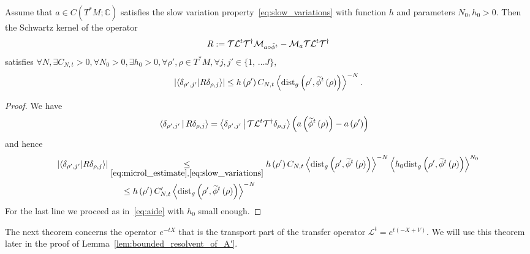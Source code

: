 \documentclass[AHL,Unicode,longabstracts,published]{cedram}
\newcommand{\clT}{\mathcal{T}}
\newcommand{\clL}{\mathcal{L}}
\newcommand{\clM}{\mathcal{M}}
\newcommand{\dist}{\mathrm{dist}}
\newcommand{\bbC}{\mathbb{C}}
\let\oldtilde\tilde
\renewcommand*{\tilde}[1]{\mathchoice{\widetilde{#1}}{\widetilde{#1}}{\oldtilde{#1}}{\oldtilde{#1}}}
\let\oldexists\exists
\renewcommand*{\exists}{\mathrel{\oldexists}}
\let\oldforall\forall
\renewcommand*{\forall}{\mathrel{\oldforall}}
\begin{document}
\begin{cBoxB}{}
\begin{lemm}\label{lem:Basic_Egorov_lemma}
Assume that $a\in C(T^{*}M;\bbC)$ satisfies the slow variation property~\eqref{eq:slow_variations} with function $h$ and parameters $N_{0},h_{0}>0$. Then the Schwartz kernel of the operator
\[
R:=\clT\clL^{t}\clT^{\dagger}\clM_{a\circ\tilde{\phi}^{t}}-\clM_{a}\clT\clL^{t}\clT^{\dagger}
\]
satisfies $\forall N,\exists C_{N,t}>0,\forall N_{0}>0,\exists h_{0}>0,\forall\rho',\rho\in T^{*}M,\forall j,j'\in\{ 1,\,\ldots J\},$
\begin{equation}\label{eq:Egorov_Lemma}
\left|\langle\delta_{\rho',j'}|R\delta_{\rho,j}\rangle\right|\leq h\left(\rho'\right)C_{N,t}\left\langle \dist_{g}\left(\rho',\tilde{\phi}^{t}\left(\rho\right)\right)\right\rangle ^{-N}.
\end{equation}
\end{lemm}
\end{cBoxB}

\begin{proof}
We have
\begin{align*}
\left\langle\delta_{\rho',j'}\,\middle|\,R\delta_{\rho,j}\right\rangle & =\left\langle\delta_{\rho',j'}\,\middle|\,\clT\clL^{t}\clT^{\dagger}\delta_{\rho,j}\right\rangle\left(a\left(\tilde{\phi}^{t}\left(\rho\right)\right)-a\left(\rho'\right)\right)
\end{align*}
and hence
\begin{align*}
\left|\langle\delta_{\rho',j'}|R\delta_{\rho,j}\rangle\right| & \underset{\eqref{eq:microl_estimate},\eqref{eq:slow_variations}}{\leq}h\left(\rho'\right)C_{N,t}\left\langle \dist_{g}\left(\rho',\tilde{\phi}^{t}\left(\rho\right)\right)\right\rangle ^{-N}\left\langle h_{0}\dist_{g}\left(\rho',\tilde{\phi}^{t}\left(\rho\right)\right)\right\rangle ^{N_{0}}\\
& \mkern28mu\leq h\left(\rho'\right)C'_{N,t}\left\langle \dist_{g}\left(\rho',\tilde{\phi}^{t}\left(\rho\right)\right)\right\rangle ^{-N}
\end{align*}
For the last line we proceed as in~\eqref{eq:aide} with $h_{0}$ small enough.
\end{proof}

The next theorem concerns the operator $e^{-tX}$ that is the transport part of the transfer operator $\clL^{t}=e^{t(-X+V)}$. We will use this theorem later in the proof of Lemma~\ref{lem:bounded_resolvent_of_A'}.
\end{document}
